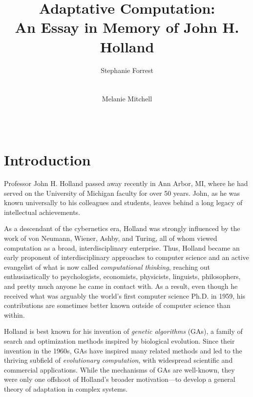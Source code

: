 \documentclass{sig-alternate}
\title{Adaptative Computation:\\ An Essay in Memory of John H. Holland}
\author 
{\alignauthor
 Stephanie Forrest\\
 \affaddr{University of New Mexico}\\
 \affaddr{Santa Fe Institute}\\
 \email{forrest@cs.unm.edu}
 \alignauthor
Melanie Mitchell \\
 \affaddr{Portland State University}\\
 \affaddr{Santa Fe Institute}\\
 \email{mm@pdx.edu}
}
\begin{document}
\maketitle

% 

\section{Introduction}

Professor John H. Holland passed away recently in Ann Arbor, MI, where
he had served on the University of Michigan faculty for over 50 years.
John, as he was known universally to his colleagues and students,
leaves behind a long legacy of intellectual achievements.

As a descendant of the cybernetics era, Holland was strongly
influenced by the work of von Neumann, Wiener, Ashby, and Turing, all
of whom viewed computation as a broad, interdisciplinary enterprise.
Thus, Holland became an early proponent of interdisciplinary
approaches to computer science and an active evangelist of what is now
called \emph{computational thinking}, reaching out enthusiastically to
psychologists, economists, physicists, linguists, philosophers, and
pretty much anyone he came in contact with.  As a result, even though
he received what was arguably the world's first computer science
Ph.D. in 1959, his contributions are sometimes better known outside of
computer science than within.

Holland is best known for his invention of \emph{genetic
  algorithms} (GAs), a family of search and optimization methods inspired
by biological evolution.  Since their invention in the 1960s, GAs have
inspired many related methods and led to the thriving subfield of
\emph{evolutionary computation}, with widespread scientific and
commercial applications.  While the mechanisms of GAs are well-known,
they were only one
offshoot of Holland's broader motivation---to develop a general
theory of adaptation in complex systems.  
\end{document}
